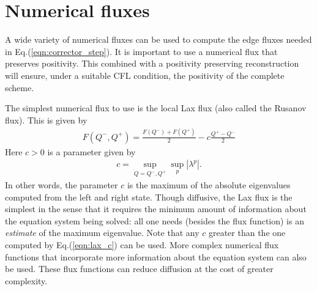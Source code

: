 \documentclass[11pt, reqno]{amsart}
\newcommand{\eqr}[1]{Eq.\thinspace(#1)}
\theoremstyle{definition}
\begin{document}
\section{Numerical fluxes}

A wide variety of numerical fluxes can be used to compute the edge
fluxes needed in \eqr{\ref{eqn:corrector_step}}. It is important to
use a numerical flux that preserves positivity. This combined with a
positivity preserving reconstruction will ensure, under a suitable CFL
condition, the positivity of the complete scheme.

The simplest numerical flux to use is the local Lax flux (also called
the Rusanov flux). This is given by
\begin{align}
  F(Q^-,Q^+) = \frac{F(Q^-) + F(Q^+)}{2} - c\frac{Q^+- Q^-}{2}
\end{align}
Here $c>0$ is a parameter given by
\begin{align}
  c = \sup_{Q=Q^-,Q^+} \sup_p | \lambda^p |. \label{eqn:lax_c}
\end{align}
In other words, the parameter $c$ is the maximum of the absolute
eigenvalues computed from the left and right state. Though diffusive,
the Lax flux is the simplest in the sense that it requires the minimum
amount of information about the equation system being solved: all one
needs (besides the flux function) is an \emph{estimate} of the maximum
eigenvalue. Note that any $c$ greater than the one computed by
\eqr{\ref{eqn:lax_c}} can be used. More complex numerical flux
functions that incorporate more information about the equation system
can also be used. These flux functions can reduce diffusion at the
cost of greater complexity.
\end{document}
